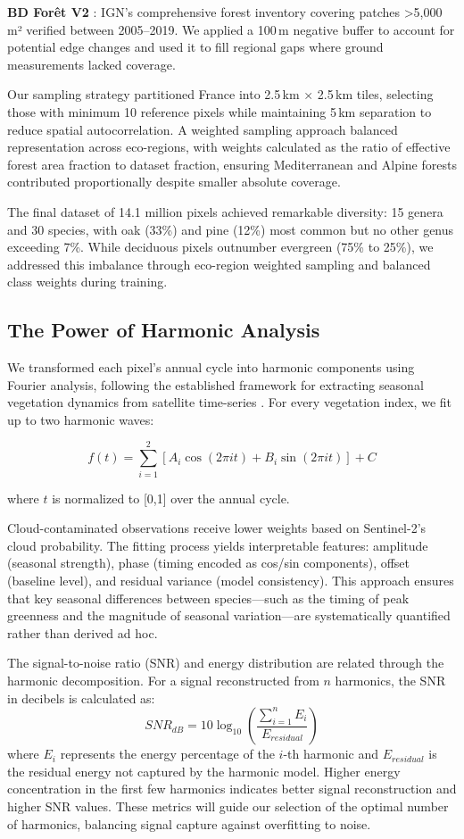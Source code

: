 \documentclass[utf8]{FrontiersinHarvard}
\begin{document}
\textbf{BD Forêt V2} \citep{IGN2024}: IGN's comprehensive forest inventory covering patches >5,000\,m² verified between 2005–2019. We applied a 100\,m negative buffer to account for potential edge changes and used it to fill regional gaps where ground measurements lacked coverage.

Our sampling strategy partitioned France into 2.5\,km × 2.5\,km tiles, selecting those with minimum 10 reference pixels while maintaining 5\,km separation to reduce spatial autocorrelation. A weighted sampling approach balanced representation across eco-regions, with weights calculated as the ratio of effective forest area fraction to dataset fraction, ensuring Mediterranean and Alpine forests contributed proportionally despite smaller absolute coverage.

The final dataset of 14.1 million pixels achieved remarkable diversity: 15 genera and 30 species, with oak (33\%) and pine (12\%) most common but no other genus exceeding 7\%. While deciduous pixels outnumber evergreen (75\% to 25\%), we addressed this imbalance through eco-region weighted sampling and balanced class weights during training.

\subsection{The Power of Harmonic Analysis}

We transformed each pixel's annual cycle into harmonic components using Fourier analysis, following the established framework for extracting seasonal vegetation dynamics from satellite time-series \citep{JonssonEklundh2002}. For every vegetation index, we fit up to two harmonic waves:

$$ f(t) = \sum_{i=1}^{2} \left[ A_i \cos(2\pi i t) + B_i \sin(2\pi i t) \right] + C $$

where $t$ is normalized to [0,1] over the annual cycle.

Cloud-contaminated observations receive lower weights based on Sentinel-2's cloud probability. The fitting process yields interpretable features: amplitude (seasonal strength), phase (timing encoded as cos/sin components), offset (baseline level), and residual variance (model consistency). This approach ensures that key seasonal differences between species—such as the timing of peak greenness and the magnitude of seasonal variation—are systematically quantified rather than derived ad hoc.

The signal-to-noise ratio (SNR) and energy distribution are related through the harmonic decomposition. For a signal reconstructed from $n$ harmonics, the SNR in decibels is calculated as:
$$SNR_{dB} = 10 \log_{10}\left(\frac{\sum_{i=1}^{n} E_i}{E_{residual}}\right)$$
where $E_i$ represents the energy percentage of the $i$-th harmonic and $E_{residual}$ is the residual energy not captured by the harmonic model. Higher energy concentration in the first few harmonics indicates better signal reconstruction and higher SNR values. These metrics will guide our selection of the optimal number of harmonics, balancing signal capture against overfitting to noise.
\end{document}
